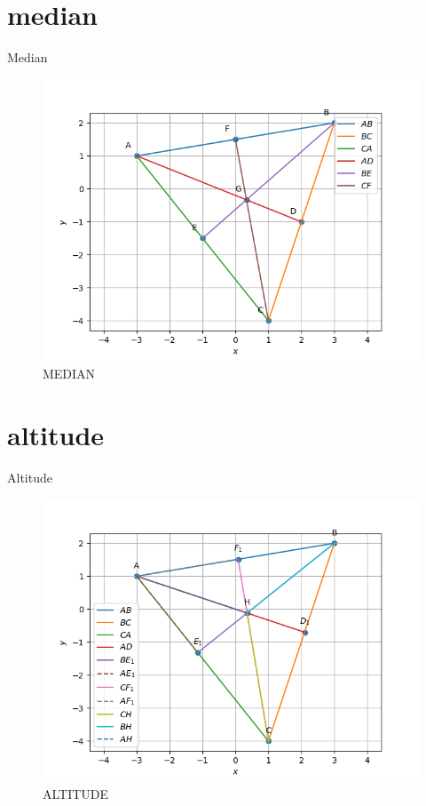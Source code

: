 \documentclass[journal,12pt,onecolumn]{IEEEtran}
\theoremstyle{remark}
\begin{document}
\begin{table}[!ht]
	\section{median}
	\centering
	
	\caption{Median}
	\label{table:median}
\end{table}
\begin{figure}
\includegraphics[width=\columnwidth]{figs/Q1.2.2.png}
\caption{MEDIAN}
\label{fig:median}
\end{figure}
\begin{table}[!ht]
	\section{altitude}
	\centering
	
	\caption{Altitude}
	\label{table:Altitude}
\end{table}
\begin{figure}
\includegraphics[width=\columnwidth]{figs/Q1.3.4.png}
\caption{ALTITUDE}
\label{fig:altitude}
\end{figure}
\end{document}
